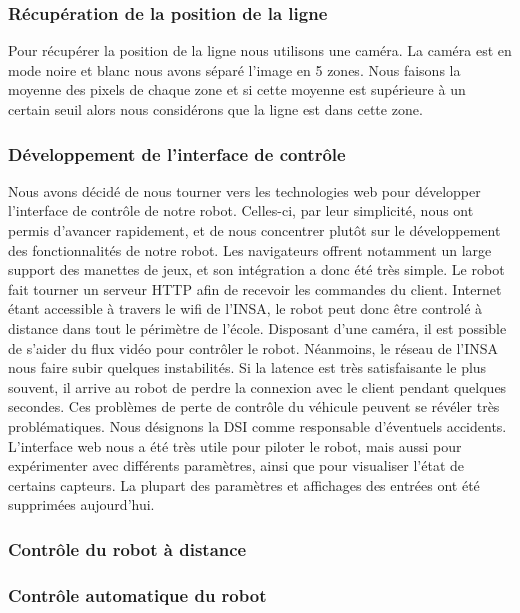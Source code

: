 \subsubsection*{Récupération de la position de la ligne}
Pour récupérer la position de la ligne nous utilisons une caméra. La caméra est en mode noire et blanc nous avons séparé l'image en 5 zones.
Nous faisons la moyenne des pixels de chaque zone et si cette moyenne est supérieure à un certain seuil alors nous considérons que la ligne est dans cette zone.



\subsubsection{Développement de l'interface de contrôle}
Nous avons décidé de nous tourner vers les technologies web pour développer l'interface de contrôle de notre robot. Celles-ci, par leur simplicité, nous ont permis d'avancer rapidement, et de nous concentrer plutôt sur le développement des fonctionnalités de notre robot. Les navigateurs offrent notamment un large support des manettes de jeux, et son intégration a donc été très simple.
Le robot fait tourner un serveur HTTP afin de recevoir les commandes du client. Internet étant accessible à travers le wifi de l'INSA, le robot peut donc être controlé à distance dans tout le périmètre de l'école. Disposant d'une caméra, il est possible de s'aider du flux vidéo pour contrôler le robot.
Néanmoins, le réseau de l'INSA nous faire subir quelques instabilités. Si la latence est très satisfaisante le plus souvent, il arrive au robot de perdre la connexion avec le client pendant quelques secondes. Ces problèmes de perte de contrôle du véhicule peuvent se révéler très problématiques. Nous désignons la DSI comme responsable d'éventuels accidents.
L'interface web nous a été très utile pour piloter le robot, mais aussi pour expérimenter avec différents paramètres, ainsi que pour visualiser l'état de certains capteurs. La plupart des paramètres et affichages des entrées ont été supprimées aujourd'hui.

\subsubsection*{Contrôle du robot à distance}

\subsubsection*{Contrôle automatique du robot}
